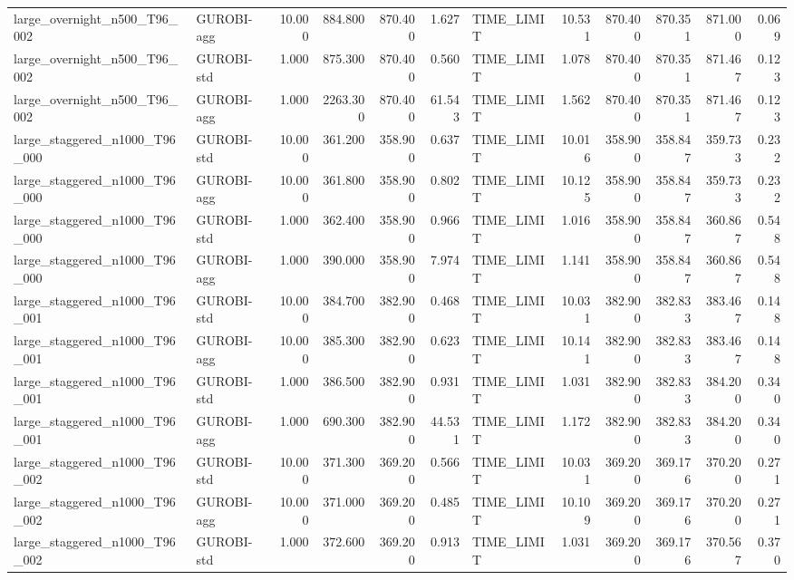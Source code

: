 \begin{table}[htbp]
\begin{tabular}{llrrrrlrrrrr}
large\_overnight\_n500\_T96\_002 & GUROBI-agg & 10.000 & 884.800 & 870.400 & 1.627 & TIME\_LIMIT & 10.531 & 870.400 & 870.351 & 871.000 & 0.069 \\
large\_overnight\_n500\_T96\_002 & GUROBI-std & 1.000 & 875.300 & 870.400 & 0.560 & TIME\_LIMIT & 1.078 & 870.400 & 870.351 & 871.467 & 0.123 \\
large\_overnight\_n500\_T96\_002 & GUROBI-agg & 1.000 & 2263.300 & 870.400 & 61.543 & TIME\_LIMIT & 1.562 & 870.400 & 870.351 & 871.467 & 0.123 \\
large\_staggered\_n1000\_T96\_000 & GUROBI-std & 10.000 & 361.200 & 358.900 & 0.637 & TIME\_LIMIT & 10.016 & 358.900 & 358.847 & 359.733 & 0.232 \\
large\_staggered\_n1000\_T96\_000 & GUROBI-agg & 10.000 & 361.800 & 358.900 & 0.802 & TIME\_LIMIT & 10.125 & 358.900 & 358.847 & 359.733 & 0.232 \\
large\_staggered\_n1000\_T96\_000 & GUROBI-std & 1.000 & 362.400 & 358.900 & 0.966 & TIME\_LIMIT & 1.016 & 358.900 & 358.847 & 360.867 & 0.548 \\
large\_staggered\_n1000\_T96\_000 & GUROBI-agg & 1.000 & 390.000 & 358.900 & 7.974 & TIME\_LIMIT & 1.141 & 358.900 & 358.847 & 360.867 & 0.548 \\
large\_staggered\_n1000\_T96\_001 & GUROBI-std & 10.000 & 384.700 & 382.900 & 0.468 & TIME\_LIMIT & 10.031 & 382.900 & 382.833 & 383.467 & 0.148 \\
large\_staggered\_n1000\_T96\_001 & GUROBI-agg & 10.000 & 385.300 & 382.900 & 0.623 & TIME\_LIMIT & 10.141 & 382.900 & 382.833 & 383.467 & 0.148 \\
large\_staggered\_n1000\_T96\_001 & GUROBI-std & 1.000 & 386.500 & 382.900 & 0.931 & TIME\_LIMIT & 1.031 & 382.900 & 382.833 & 384.200 & 0.340 \\
large\_staggered\_n1000\_T96\_001 & GUROBI-agg & 1.000 & 690.300 & 382.900 & 44.531 & TIME\_LIMIT & 1.172 & 382.900 & 382.833 & 384.200 & 0.340 \\
large\_staggered\_n1000\_T96\_002 & GUROBI-std & 10.000 & 371.300 & 369.200 & 0.566 & TIME\_LIMIT & 10.031 & 369.200 & 369.176 & 370.200 & 0.271 \\
large\_staggered\_n1000\_T96\_002 & GUROBI-agg & 10.000 & 371.000 & 369.200 & 0.485 & TIME\_LIMIT & 10.109 & 369.200 & 369.176 & 370.200 & 0.271 \\
large\_staggered\_n1000\_T96\_002 & GUROBI-std & 1.000 & 372.600 & 369.200 & 0.913 & TIME\_LIMIT & 1.031 & 369.200 & 369.176 & 370.567 & 0.370 \\

\end{tabular}
\end{table}
